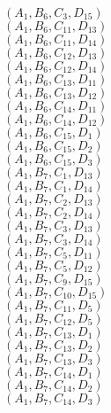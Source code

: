 \documentclass[14pt]{article}
\begin{document}
    $({A}_{1}, {B}_{6}, {C}_{3}, {D}_{15}) $ \\ 
    $({A}_{1}, {B}_{6}, {C}_{11}, {D}_{13}) $ \\ 
    $({A}_{1}, {B}_{6}, {C}_{11}, {D}_{14}) $ \\ 
    $({A}_{1}, {B}_{6}, {C}_{12}, {D}_{13}) $ \\ 
    $({A}_{1}, {B}_{6}, {C}_{12}, {D}_{14}) $ \\ 
    $({A}_{1}, {B}_{6}, {C}_{13}, {D}_{11}) $ \\ 
    $({A}_{1}, {B}_{6}, {C}_{13}, {D}_{12}) $ \\ 
    $({A}_{1}, {B}_{6}, {C}_{14}, {D}_{11}) $ \\ 
    $({A}_{1}, {B}_{6}, {C}_{14}, {D}_{12}) $ \\ 
    $({A}_{1}, {B}_{6}, {C}_{15}, {D}_{1}) $ \\ 
    $({A}_{1}, {B}_{6}, {C}_{15}, {D}_{2}) $ \\ 
    $({A}_{1}, {B}_{6}, {C}_{15}, {D}_{3}) $ \\ 
    $({A}_{1}, {B}_{7}, {C}_{1}, {D}_{13}) $ \\ 
    $({A}_{1}, {B}_{7}, {C}_{1}, {D}_{14}) $ \\ 
    $({A}_{1}, {B}_{7}, {C}_{2}, {D}_{13}) $ \\ 
    $({A}_{1}, {B}_{7}, {C}_{2}, {D}_{14}) $ \\ 
    $({A}_{1}, {B}_{7}, {C}_{3}, {D}_{13}) $ \\ 
    $({A}_{1}, {B}_{7}, {C}_{3}, {D}_{14}) $ \\ 
    $({A}_{1}, {B}_{7}, {C}_{5}, {D}_{11}) $ \\ 
    $({A}_{1}, {B}_{7}, {C}_{5}, {D}_{12}) $ \\ 
    $({A}_{1}, {B}_{7}, {C}_{9}, {D}_{15}) $ \\ 
    $({A}_{1}, {B}_{7}, {C}_{10}, {D}_{15}) $ \\ 
    $({A}_{1}, {B}_{7}, {C}_{11}, {D}_{5}) $ \\ 
    $({A}_{1}, {B}_{7}, {C}_{12}, {D}_{5}) $ \\ 
    $({A}_{1}, {B}_{7}, {C}_{13}, {D}_{1}) $ \\ 
    $({A}_{1}, {B}_{7}, {C}_{13}, {D}_{2}) $ \\ 
    $({A}_{1}, {B}_{7}, {C}_{13}, {D}_{3}) $ \\ 
    $({A}_{1}, {B}_{7}, {C}_{14}, {D}_{1}) $ \\ 
    $({A}_{1}, {B}_{7}, {C}_{14}, {D}_{2}) $ \\ 
    $({A}_{1}, {B}_{7}, {C}_{14}, {D}_{3}) $ \\ 
\end{document}
